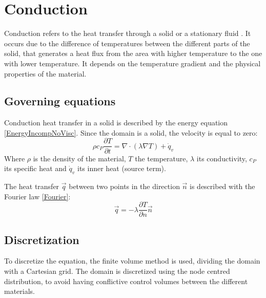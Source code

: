 \chapter{Conduction}
Conduction refers to the heat transfer through a solid or a stationary fluid \cite{Bergman2011}. It occurs due to the difference of temperatures between the different parts of the solid, that generates a heat flux from the area with higher temperature to the one with lower temperature. It depends on the temperature gradient and the physical properties of the material.

\section{Governing equations}
Conduction heat transfer in a solid is described by the energy equation \ref{EnergyIncompNoVisc}. Since the domain is a solid, the velocity is equal to zero:
\begin{equation}
\rho c_{P}\frac{\partial T}{\partial t}=\nabla\cdot\left(\lambda\nabla T\right)+\dot{q}_{v}
\label{condu}
\end{equation}
Where $\rho$ is the density of the material, $T$ the temperature, $\lambda$ its conductivity, $c_{P}$ its specific heat and $\dot{q}_{v}$ its inner heat (source term).

The heat transfer $\vec{q}$ between two points in the direction $\vec{n}$ is described with the Fourier law \ref{Fourier}:
\begin{equation}
\vec{q}=-\lambda\frac{\partial T}{\partial n}\vec{n}
\label{Fourier}
\end{equation}

\section{Discretization}
To discretize the equation, the finite volume method is used, dividing the domain with a Cartesian grid. The domain is discretized using the node centred distribution, to avoid having conflictive control volumes between the different materials.

